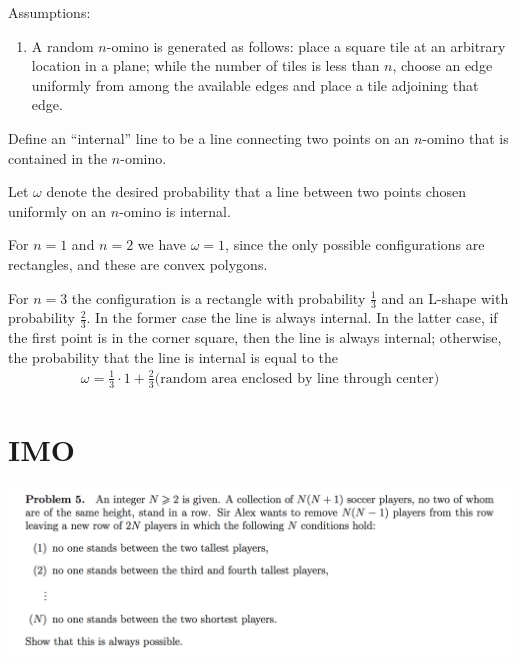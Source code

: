 \documentclass[12pt]{article}
\begin{document}
Assumptions:
\begin{enumerate}
\item A random $n$-omino is generated as follows: place a square tile at an
  arbitrary location in a plane; while the number of tiles is less than $n$,
  choose an edge uniformly from among the available edges and place a tile
  adjoining that edge.
\end{enumerate}

Define an ``internal'' line to be a line connecting two points on an $n$-omino
that is contained in the $n$-omino.

Let $\omega$ denote the desired probability that a line between two points
chosen uniformly on an $n$-omino is internal.

For $n=1$ and $n=2$ we have $\omega = 1$, since the only possible
configurations are rectangles, and these are convex polygons.

For $n=3$ the configuration is a rectangle with probability $\frac{1}{3}$ and
an L-shape with probability $\frac{2}{3}$. In the former case the line is
always internal. In the latter case, if the first point is in the corner
square, then the line is always internal; otherwise, the probability that the
line is internal is equal to the
\begin{align*}
  \omega = \frac{1}{3}\cdot 1 + \frac{2}{3} \Big(\text{random area enclosed by line through center}\Big)
\end{align*}

\section{IMO}

\newpage
\begin{mdframed}
\includegraphics[width=400pt]{img/puzzles-imo-2017-5.png}
\end{mdframed}
\end{document}
